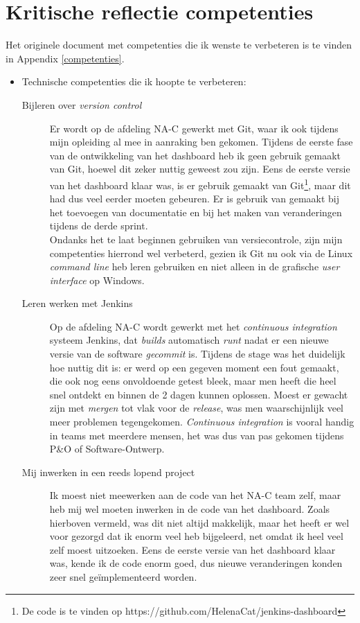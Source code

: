 \documentclass[10pt,a4paper]{article}
\begin{document}
\section{Kritische reflectie competenties}
\label{reflectie}
Het originele document met competenties die ik wenste te verbeteren is te vinden in Appendix \ref{competenties}.
\begin{itemize}
\item Technische competenties die ik hoopte te verbeteren:
\begin{description}
\item[Bijleren over \textit{version control}] Er wordt op de afdeling NA-C gewerkt met Git, waar ik ook tijdens mijn opleiding al mee in aanraking ben gekomen. Tijdens de eerste fase van de ontwikkeling van het dashboard heb ik geen gebruik gemaakt van Git, hoewel dit zeker nuttig geweest zou zijn. Eens de eerste versie van het dashboard klaar was, is er gebruik gemaakt van Git\footnote{De code is te vinden op https://github.com/HelenaCat/jenkins-dashboard}, maar dit had dus veel eerder moeten gebeuren. Er is gebruik van gemaakt bij het toevoegen van documentatie en bij het maken van veranderingen tijdens de derde sprint.\\
Ondanks het te laat beginnen gebruiken van versiecontrole, zijn mijn competenties hierrond wel verbeterd, gezien ik Git nu ook via de Linux \textit{command line} heb leren gebruiken en niet alleen in de grafische \textit{user interface} op Windows. 
\item[Leren werken met Jenkins] Op de afdeling NA-C wordt gewerkt met het \textit{continuous integration} systeem Jenkins, dat \textit{builds} automatisch \textit{runt} nadat er een nieuwe versie van de software \textit{gecommit} is. Tijdens de stage was het duidelijk hoe nuttig dit is: er werd op een gegeven moment een fout gemaakt, die ook nog eens onvoldoende getest bleek, maar men heeft die heel snel ontdekt en binnen de 2 dagen kunnen oplossen. Moest er gewacht zijn met \textit{mergen} tot vlak voor de \textit{release}, was men waarschijnlijk veel meer problemen tegengekomen. \textit{Continuous integration} is vooral handig in teams met meerdere mensen, het was dus van pas gekomen tijdens P\&O of Software-Ontwerp. 
\item[Mij inwerken in een reeds lopend project] Ik moest niet meewerken aan de code van het NA-C team zelf, maar heb mij wel moeten inwerken in de code van het dashboard. Zoals hierboven vermeld, was dit niet altijd makkelijk, maar het heeft er wel voor gezorgd dat ik enorm veel heb bijgeleerd, net omdat ik heel veel zelf moest uitzoeken. Eens de eerste versie van het dashboard klaar was, kende ik de code enorm goed, dus nieuwe veranderingen konden zeer snel ge\"implementeerd worden.

\end{description}
\end{itemize}
\end{document}
